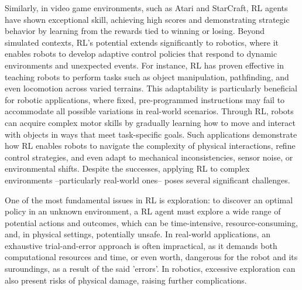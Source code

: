 Similarly, in video game environments, such as Atari and StarCraft, RL agents have shown exceptional skill, achieving
high scores and demonstrating strategic behavior by learning from the rewards tied to winning or losing.
Beyond simulated contexts, RL’s potential extends significantly to robotics, where it enables robots to develop
adaptive control policies that respond to dynamic environments and unexpected events.
For instance, RL has proven effective in teaching robots to perform tasks such as object manipulation, pathfinding, and
even locomotion across varied terrains.
This adaptability is particularly beneficial for robotic applications, where fixed, pre-programmed instructions may
fail to accommodate all possible variations in real-world scenarios.
Through RL, robots can acquire complex motor skills by gradually learning how to move and interact with objects in ways
that meet task-specific goals.
Such applications demonstrate how RL enables robots to navigate the complexity of physical interactions, refine control
strategies, and even adapt to mechanical inconsistencies, sensor noise, or environmental shifts.
Despite the successes, applying RL to complex environments --particularly real-world ones-- poses several significant
challenges.

One of the most fundamental issues in RL is exploration: to discover an optimal policy in an unknown environment,
a RL agent must explore a wide
range of potential actions and outcomes, which can be time-intensive, resource-consuming, and, in physical settings,
potentially unsafe.
In real-world applications, an exhaustive trial-and-error approach is often impractical, as it demands both
computational resources and time, or even worth, dangerous for the robot and its suroundings, as a result of the said 'errors'.
In robotics, excessive exploration can also present risks of physical damage, raising further complications.  %

